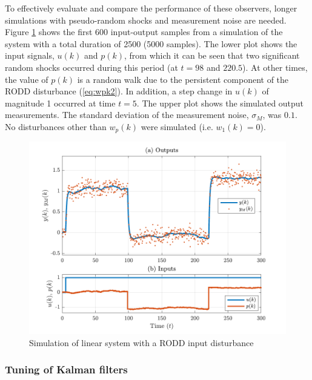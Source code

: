 To effectively evaluate and compare the performance of these observers, longer simulations with pseudo-random shocks and measurement noise are needed. Figure \ref{fig:rod-obs-sim1-ioplot} shows the first 600 input-output samples from a simulation of the system with a total duration of 2500 (5000 samples). The lower plot shows the input signals, $u(k)$ and $p(k)$, from which it can be seen that two significant random shocks occurred during this period (at $t=98$ and $220.5$). At other times, the value of $p(k)$ is a random walk due to the persistent component of the \gls{RODD} disturbance (\ref{eq:wpk2}). In addition, a step change in $u(k)$ of magnitude 1 occurred at time $t=5$. The upper plot shows the simulated output measurements. The standard deviation of the measurement noise, $\sigma_M$, was $0.1$. No disturbances other than $w_p(k)$ were simulated (i.e. $w_1(k)=0$).
\begin{figure}[htp]
	\centering
	\includegraphics[width=13cm]{images/rod_obs_sim1_all_seed_ioplot.pdf}
	\caption{Simulation of linear system with a \gls{RODD} input disturbance}
	\label{fig:rod-obs-sim1-ioplot}
\end{figure}

\subsubsection{Tuning of Kalman filters} \label{sec:sim-obs-lin-1-KF-tuning}

